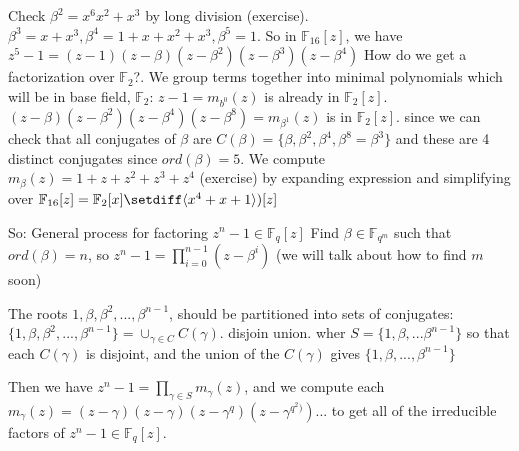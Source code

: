 \documentclass{article}
\begin{document}
Check $\beta^2 = x^6  x^2 + x^3$ by long division (exercise).
$\beta^3 = x + x^3, \beta^4 = 1+x+x^2+x^3, \beta^5 = 1$. So in
$\mathbb{F}_{16}[z]$, we have
$z^5 - 1 = (z-1)(z-\beta)(z-\beta^2)(z-\beta^3)(z-\beta^4)$
How do we get a factorization over $\mathbb{F}_2$?. We group terms together into
minimal polynomials which will be in base field, $\mathbb{F}_2$:
$z-1 = m_{b^0}(z)$ is already in $\mathbb{F}_2[z]$.
$(z-\beta)(z-\beta^2)(z-\beta^4)(z-\beta^8) = m_{\beta^1}(z)$ is in
$\mathbb{F}_2[z]$. since we can check that all conjugates of $\beta$ are
$C(\beta)=\{\beta, \beta^2, \beta^4,\beta^8 = \beta^3\}$ and these are 4
distinct conjugates since $ord(\beta) = 5$. We compute $m_\beta(z) =
1 + z + z^2 + z^3 + z^4$ (exercise) by expanding expression and simplifying
over $\mathbb{F}_{16}[z] = \mathbb{F}_2[x]\setdiff\langle x^4+x+1\rangle)[z]$

So: General process for factoring $z^n - 1 \in\mathbb{F}_q[z]$
Find $\beta\in\mathbb{F}_{q^m}$ such that $ord(\beta) = n$, so
$z^n -1 = \prod^{n-1}_{i=0} (z-\beta^i)$ (we will talk about how to find $m$ soon)

The roots $1, \beta, \beta^2, ..., \beta^{n-1}$, should be partitioned into sets of
conjugates: $\{1, \beta, \beta^2, ..., \beta^{n-1}\} = \cup_{\gamma\in C} C(\gamma).$
disjoin union.
wher $S = \{1, \beta, ...\beta^{n-1}\}$ so that each $C(\gamma)$ is disjoint, and the
union of the $C(\gamma)$ gives $\{1, \beta, ..., \beta^{n-1}\}$

Then we have $z^n -1 = \prod_{\gamma\in S} m_\gamma(z)$, and we compute each
$m_\gamma(z) = (z-\gamma) (z-\gamma)(z-\gamma^q)(z-\gamma^{q^2)})...$
to get all of the irreducible factors of $z^n-1\in\mathbb{F}_q[z]$.
\end{document}
